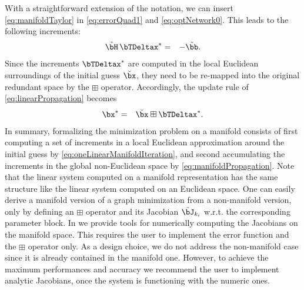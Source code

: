\documentclass[a4paper]{article}
\begin{document}
With a straightforward extension of the notation, we can insert
\eqref{eq:manifoldTaylor} in \eqref{eq:errorQuad1} and
\eqref{eq:optNetwork0}. This leads to the following increments:
\begin{eqnarray}
       \tilde \bH \, \bTDeltax^* &=& - \tilde \bb .
\label{eq:oneLinearManifoldIteration}
\end{eqnarray}
Since the increments $\bTDeltax^*$ are computed in the local Euclidean
surroundings of the initial guess $\breve{\bx}$, they need to be
re-mapped into the original redundant space by the $\boxplus$
operator. Accordingly, the update rule of \eqref{eq:linearPropagation}
becomes
\begin{eqnarray}
  \bx^*& =& \breve{\bx} \boxplus \bTDeltax^*.
\label{eq:manifoldPropagation}
\end{eqnarray}
In summary, formalizing the minimization problem on a manifold consists
of first computing a set of increments in a local Euclidean
approximation around the initial guess by
\eqref{eq:oneLinearManifoldIteration}, and second accumulating the
increments in the global non-Euclidean space by
\eqref{eq:manifoldPropagation}.  Note that the linear system computed on
a manifold representation has the same structure like the linear system
computed on an Euclidean space.  One can easily derive a manifold
version of a graph minimization from a non-manifold version, only by
defining an $\boxplus$ operator and its Jacobian $\tilde \bJ_{k_{i}}$
w.r.t.  the corresponding parameter block.  In \gopt{} we provide tools
for numerically computing the Jacobians on the manifold space.  This
requires the user to implement the error function and the $\boxplus$
operator only. As a design choice, we do not address the non-manifold
case since it is already contained in the manifold one.  However, to
achieve the maximum performances and accuracy we recommend the user to
implement analytic Jacobians, once the system is functioning with the
numeric ones.
\end{document}
